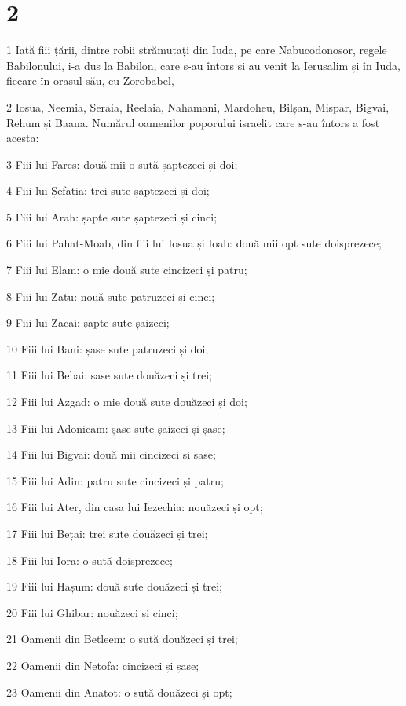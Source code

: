 \chapter{2}

\par 1 Iată fiii țării, dintre robii strămutați din Iuda, pe care Nabucodonosor, regele Babilonului, i-a dus la Babilon, care s-au întors și au venit la Ierusalim și în Iuda, fiecare în orașul său, cu Zorobabel,
\par 2 Iosua, Neemia, Seraia, Reelaia, Nahamani, Mardoheu, Bilșan, Mispar, Bigvai, Rehum și Baana. Numărul oamenilor poporului israelit care s-au întors a fost acesta:
\par 3 Fiii lui Fares: două mii o sută șaptezeci și doi;
\par 4 Fiii lui Șefatia: trei sute șaptezeci și doi;
\par 5 Fiii lui Arah: șapte sute șaptezeci și cinci;
\par 6 Fiii lui Pahat-Moab, din fiii lui Iosua și Ioab: două mii opt sute doisprezece;
\par 7 Fiii lui Elam: o mie două sute cincizeci și patru;
\par 8 Fiii lui Zatu: nouă sute patruzeci și cinci;
\par 9 Fiii lui Zacai: șapte sute șaizeci;
\par 10 Fiii lui Bani: șase sute patruzeci și doi;
\par 11 Fiii lui Bebai: șase sute douăzeci și trei;
\par 12 Fiii lui Azgad: o mie două sute douăzeci și doi;
\par 13 Fiii lui Adonicam: șase sute șaizeci și șase;
\par 14 Fiii lui Bigvai: două mii cincizeci și șase;
\par 15 Fiii lui Adin: patru sute cincizeci și patru;
\par 16 Fiii lui Ater, din casa lui Iezechia: nouăzeci și opt;
\par 17 Fiii lui Bețai: trei sute douăzeci și trei;
\par 18 Fiii lui Iora: o sută doisprezece;
\par 19 Fiii lui Hașum: două sute douăzeci și trei;
\par 20 Fiii lui Ghibar: nouăzeci și cinci;
\par 21 Oamenii din Betleem: o sută douăzeci și trei;
\par 22 Oamenii din Netofa: cincizeci și șase;
\par 23 Oamenii din Anatot: o sută douăzeci și opt;

